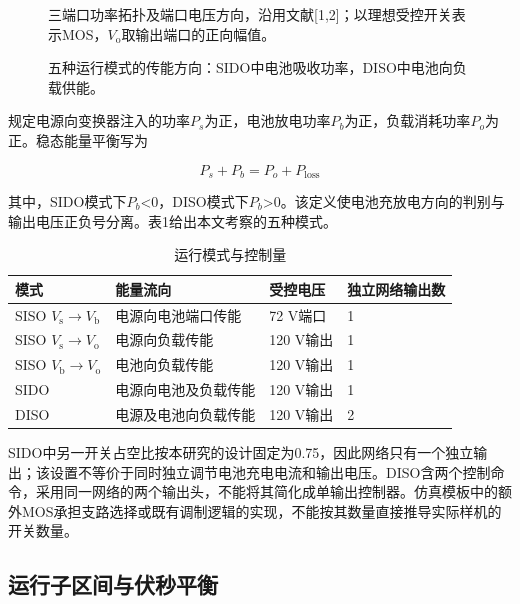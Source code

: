 \documentclass[UTF8,fontset=fandol,a4paper,twocolumn,10pt]{ctexart}
\begin{document}
\begin{figure}[!htbp]\centering\resizebox{.98\columnwidth}{!}{}
\caption{三端口功率拓扑及端口电压方向，沿用文献[1,2]；以理想受控开关表示MOS，$V_{\mathrm o}$取输出端口的正向幅值。}\label{fig:1}\end{figure}

\begin{figure}[!tp]\centering\resizebox{.98\textwidth}{!}{}
\caption{五种运行模式的传能方向：SIDO中电池吸收功率，DISO中电池向负载供能。}\label{fig:2}\end{figure}

规定电源向变换器注入的功率$P_s$为正，电池放电功率$P_b$为正，负载消耗功率$P_o$为正。稳态能量平衡写为

\begin{equation}P_s+P_b=P_o+P_{\mathrm{loss}}\label{eq:1}\end{equation}

其中，SIDO模式下$P_b$<0，DISO模式下$P_b$>0。该定义使电池充放电方向的判别与输出电压正负号分离。表1给出本文考察的五种模式。

\begin{table}[!htbp]\centering\caption{运行模式与控制量}\label{tab:1}\small\setlength{\tabcolsep}{3pt}
\begin{tabularx}{\columnwidth}{YYYY}\toprule
\textbf{模式} & \textbf{能量流向} & \textbf{受控电压} & \textbf{独立网络输出数}\\\midrule
SISO $V_{\mathrm s}$$\to$$V_{\mathrm b}$ & 电源向电池端口传能 & 72 V端口 & 1\\
SISO $V_{\mathrm s}$$\to$$V_{\mathrm o}$ & 电源向负载传能 & 120 V输出 & 1\\
SISO $V_{\mathrm b}$$\to$$V_{\mathrm o}$ & 电池向负载传能 & 120 V输出 & 1\\
SIDO & 电源向电池及负载传能 & 120 V输出 & 1\\
DISO & 电源及电池向负载传能 & 120 V输出 & 2\\
\bottomrule\end{tabularx}
\end{table}

SIDO中另一开关占空比按本研究的设计固定为0.75，因此网络只有一个独立输出；该设置不等价于同时独立调节电池充电电流和输出电压。DISO含两个控制命令，采用同一网络的两个输出头，不能将其简化成单输出控制器。仿真模板中的额外MOS承担支路选择或既有调制逻辑的实现，不能按其数量直接推导实际样机的开关数量。


\subsection{运行子区间与伏秒平衡}
\end{document}
